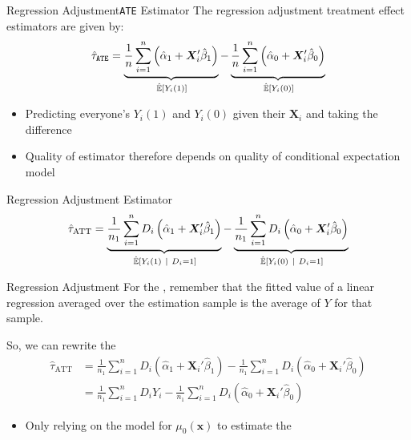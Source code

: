 \documentclass[aspectratio=169,t,11pt,table]{beamer}
\begin{document}
\begin{frame}{Regression Adjustment}{\texttt{ATE} Estimator}
  The \alert{regression adjustment treatment effect estimators} are given by:
  $$
    \hat{\tau}_{\texttt{ATE}} = 
    \underbrace{
      \frac{1}{n} \sum_{i=1}^n \left( \hat{\alpha}_1 + \bm{X}_i' \hat{\beta}_1 \right)
    }_{\expechat{Y_i(1)}} -
    \underbrace{
      \frac{1}{n} \sum_{i=1}^n \left( \hat{\alpha}_0 + \bm{X}_i' \hat{\beta}_0 \right)
    }_{\expechat{Y_i(0)}} 
  $$
  \begin{itemize}
    \item Predicting everyone's $Y_i(1)$ and $Y_i(0)$ given their $\bm{X}_i$ and taking the difference
    \item Quality of estimator therefore depends on quality of conditional expectation model
  \end{itemize}
\end{frame}

\begin{frame}{Regression Adjustment}{ Estimator}
  $$
    \hat{\tau}_{\text{ATT}} = 
    \underbrace{
      \frac{1}{n_1} \sum_{i=1}^n D_i \left( \hat{\alpha}_1 + \bm{X}_i' \hat{\beta}_1 \right)
    }_{\expechat{Y_i(1)}{D_i = 1}} - 
    \underbrace{
      \frac{1}{n_1} \sum_{i=1}^n D_i \left( \hat{\alpha}_0 + \bm{X}_i' \hat{\beta}_0 \right)
    }_{\expechat{Y_i(0)}{D_i = 1}} 
  $$
\end{frame}

\begin{frame}{Regression Adjustment}
  For the , remember that the fitted value of a linear regression averaged over the estimation sample is the average of $Y$ for that sample.
  
  \bigskip
  So, we can rewrite the 
  \begin{align*}
    \hat{\tau}_{\text{ATT}} &= 
    \frac{1}{n_1} \sum_{i=1}^n D_i \left( \hat{\alpha}_1 + \bm{X}_i' \hat{\beta}_1 \right) -
    \frac{1}{n_1} \sum_{i=1}^n D_i \left( \hat{\alpha}_0 + \bm{X}_i' \hat{\beta}_0 \right) \\ 
    &= \frac{1}{n_1} \sum_{i=1}^n D_i Y_i - 
    \frac{1}{n_1} \sum_{i=1}^n D_i \left( \hat{\alpha}_0 + \bm{X}_i' \hat{\beta}_0 \right) 
  \end{align*}
  \begin{itemize}
    \item Only relying on the model for $\mu_{0}(\bm{x})$ to estimate the 
  \end{itemize}
\end{frame}
\end{document}
